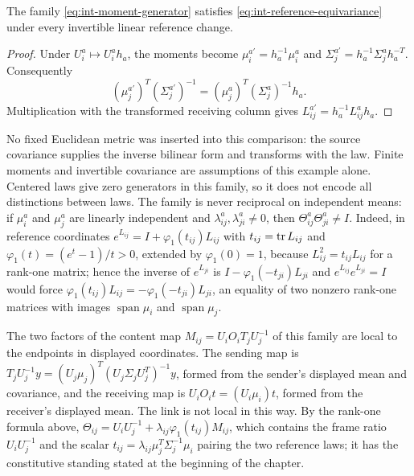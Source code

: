 The family \cref{eq:int-moment-generator} satisfies \cref{eq:int-reference-equivariance} under every invertible linear reference change.
\begin{proof}
Under $U_i^a\mapsto U_i^a h_a$, the moments become
$\mu_i^{a\prime}=h_a^{-1}\mu_i^a$ and
$\Sigma_j^{a\prime}=h_a^{-1}\Sigma_j^a h_a^{-T}$.
Consequently
\begin{equation}
(\mu_j^{a\prime})^T(\Sigma_j^{a\prime})^{-1}
=(\mu_j^a)^T(\Sigma_j^a)^{-1}h_a.
\end{equation}
Multiplication with the transformed receiving column gives $L_{ij}^{a\prime}=h_a^{-1}L_{ij}^a h_a$.
\end{proof}
No fixed Euclidean metric was inserted into this comparison: the source covariance supplies the inverse bilinear form and transforms with the law. Finite moments and invertible covariance are assumptions of this example alone. Centered laws give zero generators in this family, so it does not encode all distinctions between laws. The family is never reciprocal on independent means: if $\mu_i^a$ and $\mu_j^a$ are linearly independent and $\lambda_{ij}^a,\lambda_{ji}^a\neq0$, then $\Theta_{ij}^a\Theta_{ji}^a\neq I$. Indeed, in reference coordinates $e^{L_{ij}}=I+\varphi_1(t_{ij})L_{ij}$ with $t_{ij}=\operatorname{tr} L_{ij}$ and $\varphi_1(t)=(e^t-1)/t>0$, extended by $\varphi_1(0)=1$, because $L_{ij}^2=t_{ij}L_{ij}$ for a rank-one matrix; hence the inverse of $e^{L_{ji}}$ is $I-\varphi_1(-t_{ji})L_{ji}$ and $e^{L_{ij}}e^{L_{ji}}=I$ would force $\varphi_1(t_{ij})L_{ij}=-\varphi_1(-t_{ji})L_{ji}$, an equality of two nonzero rank-one matrices with images $\operatorname{span}\mu_i$ and $\operatorname{span}\mu_j$.

The two factors of the content map $M_{ij}=U_iO_iT_jU_j^{-1}$ of this family are local to the endpoints in displayed coordinates. The sending map is $T_jU_j^{-1}y=(U_j\mu_j)^T(U_j\Sigma_jU_j^T)^{-1}y$, formed from the sender's displayed mean and covariance, and the receiving map is $U_iO_it=(U_i\mu_i)t$, formed from the receiver's displayed mean. The link is not local in this way. By the rank-one formula above, $\Theta_{ij}=U_iU_j^{-1}+\lambda_{ij}\varphi_1(t_{ij})M_{ij}$, which contains the frame ratio $U_iU_j^{-1}$ and the scalar $t_{ij}=\lambda_{ij}\mu_j^T\Sigma_j^{-1}\mu_i$ pairing the two reference laws; it has the constitutive standing stated at the beginning of the chapter.

